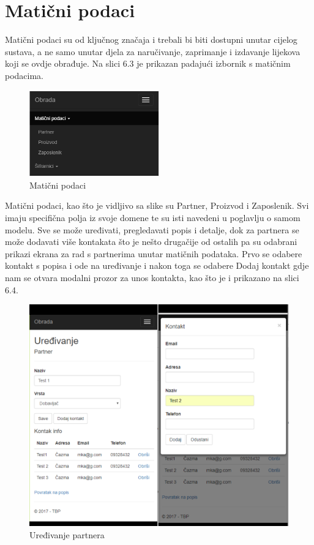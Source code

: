 \documentclass[a4paper,12pt]{foi}
\begin{document}
\section{Matični podaci}

Matični podaci su od ključnog značaja i trebali bi biti dostupni unutar cijelog sustava, a ne samo unutar djela za naručivanje, zaprimanje i izdavanje lijekova koji se ovdje obrađuje. Na slici 6.3 je prikazan padajući izbornik s matičnim podacima.


\begin{figure}[h]
\centering 
\includegraphics[width=0.5\textwidth]{maticni_podaci.png}
\caption{Matični podaci}
\label{slika-5}
\end{figure}

Matični podaci, kao što je vidljivo sa slike su Partner, Proizvod i Zaposlenik. Svi imaju specifična polja iz svoje domene te su isti navedeni u poglavlju o samom modelu. Sve se može uređivati, pregledavati popis i detalje, dok za partnera se može dodavati više kontakata što je nešto drugačije od ostalih pa su odabrani prikazi ekrana za rad s partnerima unutar matičnih podataka. Prvo se odabere kontakt s popisa i ode na uređivanje i nakon toga se odabere Dodaj kontakt gdje nam se otvara modalni prozor za unos kontakta, kao što je i prikazano na slici 6.4.

\begin{figure}[h]
\centering 
\includegraphics[height=0.55\textwidth]{uredivanje_partner_kontakt.png}
\caption{Uređivanje partnera}
\label{slika-6}
\end{figure}
\end{document}
